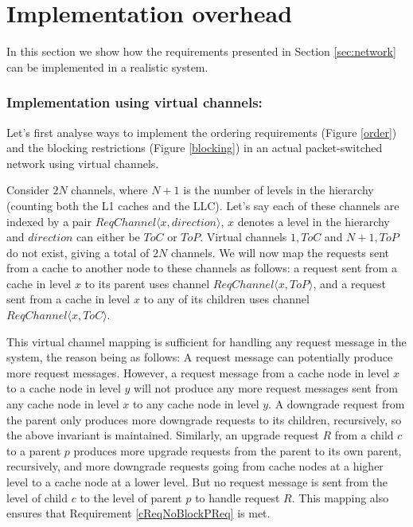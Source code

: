 \section{Implementation overhead}
\label{sec:implementation}
In this section we show how the requirements presented in Section
\ref{sec:network} can be implemented in a realistic system.

\subsubsection{Implementation using virtual channels:}

Let's first analyse ways to implement the ordering requirements (Figure
\ref{order}) and the blocking restrictions (Figure \ref{blocking}) in an actual
packet-switched network using virtual channels.

Consider $2N$ channels, where $N + 1$ is the number of levels in the hierarchy
(counting both the L1 caches and the LLC). Let's say each of these channels are
indexed by a pair $ReqChannel\langle x, direction \rangle$, $x$ denotes a level
in the hierarchy and $direction$ can either be $ToC$ or $ToP$.  Virtual
channels $1, ToC$ and $N + 1, ToP$ do not exist, giving a total of $2N$
channels. We will now map the requests sent from a cache to another node to
these channels as follows: a request sent from a cache in level $x$ to its
parent uses channel $ReqChannel\langle x, ToP \rangle$, and a request sent from
a cache in level $x$ to any of its children uses channel $ReqChannel\langle x,
ToC \rangle$.

This virtual channel mapping is sufficient for handling any request message in
the system, the reason being as follows: A request message can potentially
produce more request messages. However, a request message from a cache node in
level $x$ to a cache node in level $y$ will not produce any more request
messages sent from any cache node in level $x$ to any cache node in level $y$. A
downgrade request from the parent only produces more downgrade requests to its
children, recursively, so the above invariant is maintained. Similarly, an
upgrade request $R$ from a child $c$ to a parent $p$ produces more upgrade
requests from the parent to its own parent, recursively, and more downgrade
requests going from cache nodes at a higher level to a cache node at a lower
level. But no request message is sent from the level of child $c$ to the level
of parent $p$ to handle request $R$. This mapping also ensures that Requirement
\ref{cReqNoBlockPReq} is met.

